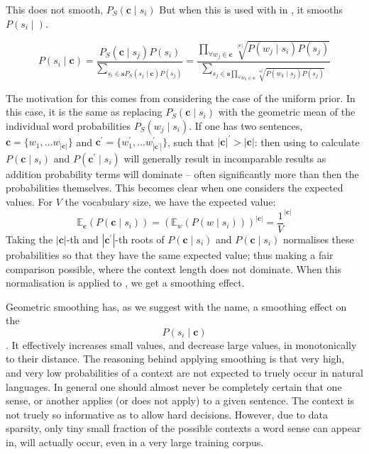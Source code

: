 \documentclass{sig-alternate}
\renewcommand{\c}{\mathbf{c}}
\newcommand{\s}{\mathbf{s}}
\begin{document}
This does not smooth, $P_S(\c \mid s_{i})$
But when this is used with in , it smooths $P(s_{i} \mid )$.

\begin{equation} \label{eq:generalwsdsmoothed}
P(s_{i}\mid\c)=\dfrac{P_{S}(\c\mid s_{j})P(s_{i})}{\sum_{s_{i}\in\s P_{S}(s_{j}\mid\c)P(s_{j})}}=\dfrac{\prod_{\forall w_{j}\in\c}\sqrt[|\c|]{P(w_{j}\mid s_{i})P(s_{j})}}{\sum_{s_{j}\in\s\prod_{\forall w_{k}\in\c}\sqrt[|\c|]{P(w_{k}\mid s_{j})P(s_{j})}}}
\end{equation}

The motivation for this comes from considering the case of the uniform prior.
In this case, it is the same as replacing $P_S(\c \mid s_{i})$ with the geometric mean of the individual word probabilities $P_S(w_j \mid s_{i})$. 
If one has two sentences, $\c=\{w_1,...w_{|\c|}\}$ and $\c^\prime=\{w_1^\prime,...w^\prime_{|\c^\prime|}\}$, such that $|\c|^\prime > |\c|$:
then using  to calculate $P(\c \mid s_{i})$ and $P(\c^\prime \mid s_{i})$ will generally result in incomparable results as addition probability terms will dominate -- often significantly more than then the probabilities themselves.
This becomes clear when one considers the expected values. For $V$ the vocabulary size, we have the expected value:
\begin{equation} \label{eq:expectcontexprob}
\mathbb{E}_\c(P(\c \mid s_{i}))
=(\mathbb{E}_w(P(w \mid s_i)))^{|\c|}
= \frac{1}{V}^{|\c|}
\end{equation}
Taking the $|\c|$-th and $|\c^\prime|$-th roots of $P(\c \mid s_{i})$ and $P(\c \mid s_{i})$ normalises these probabilities so that they have the same expected value; thus making a fair comparison possible, where the context length does not dominate.
When this normalisation is applied to , we get a smoothing effect.


Geometric smoothing has, as we suggest with the name, a smoothing effect on the $$P(s_{i}\mid\c)$$. It effectively increases small values, and decrease large values, in monotonically to their distance. The reasoning behind applying smoothing is that very high, and very low probabilities of a context are not expected to truely occur in natural languages. In general one should almost never be completely certain that one sense, or another applies (or does not apply) to a given sentence. The context is not truely so informative as to allow hard decisions. However, due to data sparsity, only tiny small fraction of the possible contexts a word sense can appear in, will actually occur, even in a very large training corpus.
\end{document}
